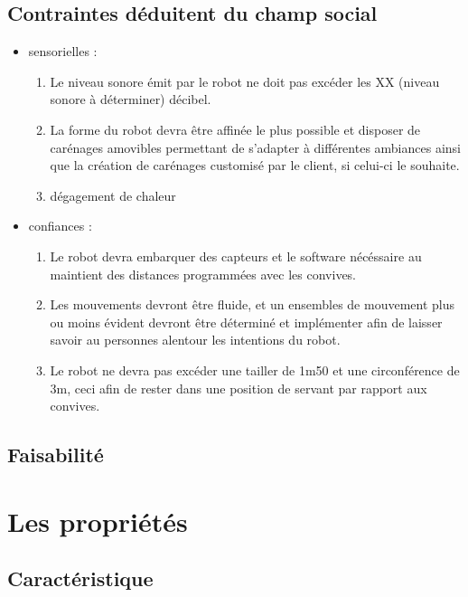 \subsection{Contraintes déduitent du champ social}

\begin{itemize}
\item sensorielles :
  \begin{enumerate}
  \item Le niveau sonore émit par le robot ne doit pas excéder les XX (niveau sonore à déterminer) décibel.
  \item La forme du robot devra être affinée le plus possible et disposer de carénages amovibles permettant de s'adapter à différentes ambiances ainsi que la création de carénages customisé par le client, si celui-ci le souhaite.
  
  \item dégagement de chaleur
  \end{enumerate}
\item confiances :
  \begin{enumerate}
  \item Le robot devra embarquer des capteurs et le software nécéssaire au maintient des distances programmées avec les convives.
  \item Les mouvements devront être fluide, et un ensembles de mouvement plus ou moins évident devront être déterminé et implémenter afin de laisser savoir au personnes alentour les intentions du robot.
  \item Le robot ne devra pas excéder une tailler de 1m50 et une circonférence de 3m, ceci afin de rester dans une position de servant par rapport aux convives.
  \end{enumerate}
\end{itemize}


\subsection{Faisabilité}


\section{Les propriétés}
\subsection{Caractéristique}
